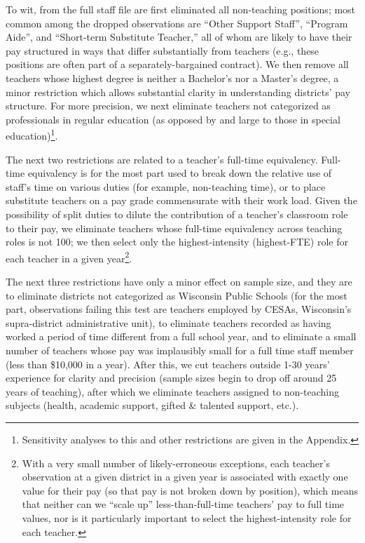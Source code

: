 \documentclass[]{article}
\let\rmarkdownfootnote\footnote%
\def\footnote{\protect\rmarkdownfootnote}
\begin{document}
To wit, from the full staff file are first eliminated all non-teaching
positions; most common among the dropped observations are ``Other
Support Staff'', ``Program Aide'', and ``Short-term Substitute
Teacher,'' all of whom are likely to have their pay structured in ways
that differ substantially from teachers (e.g., these positions are often
part of a separately-bargained contract). We then remove all teachers
whose highest degree is neither a Bachelor's nor a Master's degree, a
minor restriction which allows substantial clarity in understanding
districts' pay structure. For more precision, we next eliminate teachers
not categorized as professionals in regular education (as opposed by and
large to those in special education)\footnote{Sensitivity analyses to
  this and other restrictions are given in the Appendix.}.

The next two restrictions are related to a teacher's full-time
equivalency. Full-time equivalency is for the most part used to break
down the relative use of staff's time on various duties (for example,
non-teaching time), or to place substitute teachers on a pay grade
commensurate with their work load. Given the possibility of split duties
to dilute the contribution of a teacher's classroom role to their pay,
we eliminate teachers whose full-time equivalency across teaching roles
is not 100; we then select only the highest-intensity (highest-FTE) role
for each teacher in a given year\footnote{With a very small number of
  likely-erroneous exceptions, each teacher's observation at a given
  district in a given year is associated with exactly one value for
  their pay (so that pay is not broken down by position), which means
  that neither can we ``scale up'' less-than-full-time teachers' pay to
  full time values, nor is it particularly important to select the
  highest-intensity role for each teacher.}.

The next three restrictions have only a minor effect on sample size, and
they are to eliminate districts not categorized as Wisconsin Public
Schools (for the most part, observations failing this test are teachers
employed by CESAs, Wisconsin's supra-district administrative unit), to
eliminate teachers recorded as having worked a period of time different
from a full school year, and to eliminate a small number of teachers
whose pay was implausibly small for a full time staff member (less than
\$10,000 in a year). After this, we cut teachers outside 1-30 years'
experience for clarity and precision (sample sizes begin to drop off
around 25 years of teaching), after which we eliminate teachers assigned
to non-teaching subjects (health, academic support, gifted \& talented
support, etc.).
\end{document}
